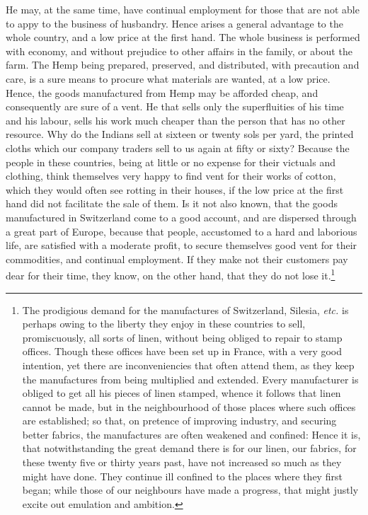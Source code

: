 \documentclass[a4paper, 11pt, oneside, polutonikogreek, english]{article}
\begin{document}
He may, at the same time, have continual employment for those that are not able to appy to the business of husbandry. Hence arises a general advantage to the whole country, and a low price at the first hand. The whole business is performed with economy, and without prejudice to other affairs in the family, or about the farm. The Hemp being prepared, preserved, and distributed, with precaution and care, is a sure means to procure what materials are wanted, at a low price. Hence, the goods manufactured from Hemp may be afforded cheap, and consequently are sure of a vent. He that sells only the superfluities of his time and his labour, sells his work much cheaper than the person that has no other resource. Why do the Indians sell at sixteen or twenty sols per yard, the printed cloths which our company traders sell to us again at fifty or sixty? Because the people in these countries, being at little or no expense for their victuals and clothing, think themselves very happy to find vent for their works of cotton, which they would often see rotting in their houses, if the low price at the first hand did not facilitate the sale of them. Is it not also known, that the goods manufactured in Switzerland come to a good account, and are dispersed through a great part of Europe, because that people, accustomed to a hard and laborious life, are satisfied with a moderate profit, to secure themselves good vent for their commodities, and continual employment. If they make not their customers pay dear for their time, they know, on the other hand, that they do not lose it.\footnote{The prodigious demand for the manufactures of Switzerland, Silesia, \emph{etc.} is perhaps owing to the liberty they enjoy in these countries to sell, promiscuously, all sorts of linen, without being obliged to repair to stamp offices. Though these offices have been set up in France, with a very good intention, yet there are inconveniencies that often attend them, as they keep the manufactures from being multiplied and extended. Every manufacturer is obliged to get all his pieces of linen stamped, whence it follows that linen cannot be made, but in the neighbourhood of those places where such offices are established; so that, on pretence of improving industry, and securing better fabrics, the manufactures are often weakened and confined: Hence it is, that notwithstanding the great demand there is for our linen, our fabrics, for these twenty five or thirty years past, have not increased so much as they might have done. They continue ill confined to the places where they first began; while those of our neighbours have made a progress, that might justly excite out emulation and ambition.}
\end{document}
